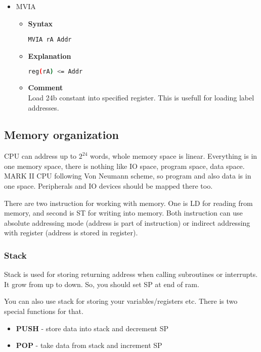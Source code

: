 \begin{itemize}
    \item MVIA
    \begin{itemize}
        \item \textbf{Syntax}
        \begin{lstlisting}[language={[x86masm]Assembler}, frame=single]
    MVIA rA Addr
        \end{lstlisting}
        \item \textbf{Explanation}
        \begin{lstlisting}[language=bash, frame=single]
    reg(rA) <= Addr
        \end{lstlisting}
        \item \textbf{Comment} \\
    Load 24b constant into specified register. This is usefull for loading label addresses.
    \end{itemize}

\end{itemize}

\subsection{Memory organization}

CPU can address up to $2^{24}$ words, whole memory space is linear. Everything
is in one memory space, there is nothing like IO space, program space, data
space. MARK II CPU following Von Neumann scheme, so program and also data is in
one space. Peripherals and IO devices should be mapped there too.

There are two instruction for working with memory. One is LD for reading from
memory, and second is ST for writing into memory. Both instruction can use
absolute addressing mode (address is part of instruction) or indirect
addressing with register (address is stored in register).

\subsubsection{Stack}

Stack is used for storing returning address when calling subroutines or
interrupts. It grow from up to down. So, you should set SP at end of ram.

You can also use stack for storing your variables/registers etc. There is two
special functions for that.

\begin{itemize}
    \item \textbf{PUSH} - store data into stack and decrement SP
    \item \textbf{POP} - take data from stack and increment SP
\end{itemize}


